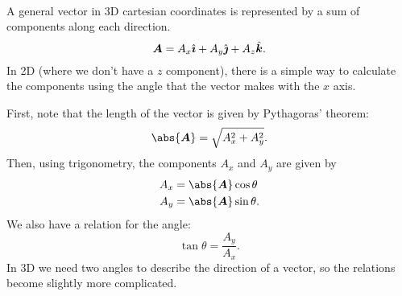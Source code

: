 \documentclass[../classical_mechanics.tex]{subfiles}
\begin{document}
        \paragraph{}
        A general vector in 3D cartesian coordinates is represented by a sum of components along each direction.
        \begin{equation}
            \boldsymbol{A}=A_x\hat{\boldsymbol{\imath}}+A_y\hat{\boldsymbol{\jmath}}+A_z\hat{\boldsymbol{k}}.
        \end{equation}
        In 2D (where we don't have a $z$ component), there is a simple way to calculate the components using the angle that the vector makes with the $x$ axis.
        \begin{figure}[H]
            \centering
        \end{figure}
        First, note that the length of the vector is given by Pythagoras' theorem:
        \begin{equation}\label{eq:2d-polar-length}
            \abs{\vec{A}}=\sqrt{A_x^2+A_y^2}.
        \end{equation}
        Then, using trigonometry, the components $A_x$ and $A_y$ are given by
        \begin{align}
            A_x&=\abs{\vec{A}}\cos\theta\label{eq:2d-polar-x-component}\\
            A_y&=\abs{\vec{A}}\sin\theta\label{eq:2d-polar-y-component}.
        \end{align}
        We also have a relation for the angle:
        \begin{equation}
            \tan\theta=\frac{A_y}{A_x}\label{eq:2d-polar-theta}.
        \end{equation}
        In 3D we need two angles to describe the direction of a vector, so the relations become slightly more complicated.
\end{document}
